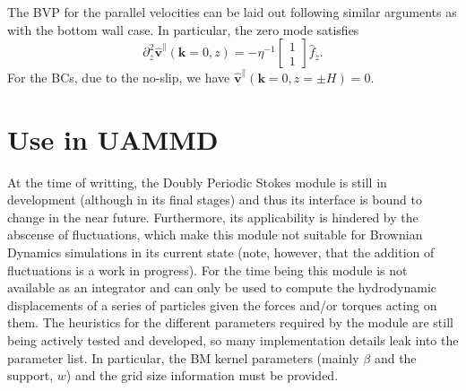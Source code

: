 \documentclass[ twoside,openright,titlepage,numbers=noenddot,%
headinclude,footinclude,cleardoublepage=empty,abstract=on,
BCOR=5mm,paper=a4,fontsize=11pt, dvipsnames
]{scrreprt}
\renewcommand{\vec}[1]{\bm{#1}}
\newcommand{\fou}[1]{\widehat{#1}}
\newcommand{\fvel}{v}
\begin{document}
The \gls{BVP} for the parallel velocities can be laid out following similar arguments as with the bottom wall case. In particular, the zero mode satisfies
\begin{equation}
  \partial_z^2\fou{\vec{\fvel}}^\parallel(\vec{k} = 0, z) = -\eta^{-1}
  \begin{bmatrix}
    1\\
    1
  \end{bmatrix}
  \fou{f}_z.
\end{equation}
For the \glspl{BC}, due to the no-slip, we have $\fou{\vec{\fvel}}^\parallel(\vec{k} = 0, z=\pm H) = 0$.

\section*{Use in UAMMD}
At the time of writting, the Doubly Periodic Stokes module is still in development (although in its final stages) and thus its interface is bound to change in the near future. Furthermore, its applicability is hindered by the abscense of fluctuations, which make this module not suitable for Brownian Dynamics simulations in its current state (note, however, that the addition of fluctuations is a work in progress). For the time being this module is not available as an integrator and can only be used to compute the hydrodynamic displacements of a series of particles given the forces and/or torques acting on them. The heuristics for the different parameters required by the module are still being actively tested and developed, so many implementation details leak into the parameter list. In particular, the BM kernel parameters (mainly $\beta$ and the support, $w$) and the grid size information must be provided.
\end{document}
